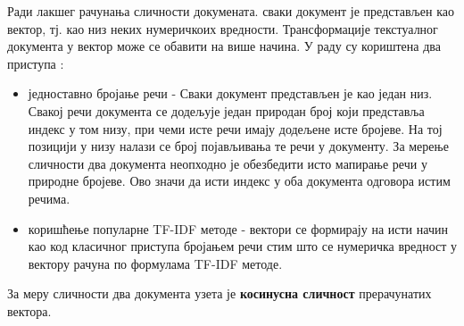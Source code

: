 Ради лакшег рачунања сличности докумената. сваки документ је представљен као вектор, тј. као низ неких нумеричкоих вредности. Трансформације текстуалног документа у вектор може се обавити на више начина. У раду су кориштена два приступа :
\begin{itemize}
\item једноставно бројање речи - Сваки документ представљен је као један низ. Свакој речи документа се додељује један природан број који представља индекс у том низу, при чеми исте речи имају додељене исте бројеве. На тој позицији у низу налази се број појављивања те речи у документу. За мерење сличности два документа неопходно је обезбедити исто мапирање речи у природне бројеве. Ово значи да исти индекс у оба документа одговора истим речима.
\item коришћење популарне TF-IDF методе - вектори се формирају на исти начин као код класичног приступа бројањем речи стим што се нумеричка вредност у вектору рачуна по формулама TF-IDF методе.
\end{itemize}

За меру сличности два документа узета је \textbf{косинусна сличност} прерачунатих вектора.
